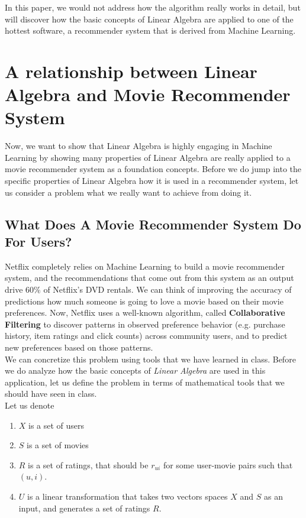 \documentclass[paper=a4, fontsize=12pt]{scrartcl} %
\numberwithin{equation}{section} %
\numberwithin{figure}{section} %
\numberwithin{table}{section} %
\begin{document}
In this paper, we would not address how the algorithm really works in detail,
but will discover how the basic concepts of Linear Algebra are
applied to one of the hottest software, a recommender system that is derived
from Machine Learning.

\pagebreak

\section{A relationship between Linear Algebra and Movie Recommender System}

Now, we want to show that Linear Algebra is highly engaging in Machine Learning
by showing many properties of Linear Algebra are really  applied to a movie
recommender system as a foundation concepts. Before we do jump into the specific
properties of Linear Algebra how it is used in a recommender system,
let us consider a problem what we really want to achieve from doing it.

\bigskip

\subsection{What Does A Movie Recommender System Do For Users?}

Netflix completely relies on Machine Learning to build a movie recommender system, and
the recommendations that come out from this system as an output drive \(60\%\)
of Netflix's DVD rentals. We can think of improving the accuracy of predictions
how much someone is going to love a movie based on their movie preferences.
Now, Netflix uses a well-known algorithm, called \textbf{Collaborative Filtering} to discover
patterns in observed preference behavior (e.g. purchase history, item ratings and click counts) across
community users, and to predict new preferences based on those patterns. \\

We can concretize this problem using tools that we have learned in class.
Before we do analyze how the basic concepts of \textit{Linear Algebra} are used in this application,
let us define the problem in terms of mathematical tools that we should have seen
in class. \\

Let us denote

\begin{enumerate}
	\item \(X\) is a set of users
	\item \(S\) is a set of movies
  \item \(R\) is a set of ratings, that should be \(r_{ui}\) for some user-movie
    pairs such that \((u,i)\).
  \item \(U\) is a linear transformation that takes two vectors spaces \(X\) and
    \(S\) as an input, and generates a set of ratings \(R\).
  \end{enumerate}
\end{document}
